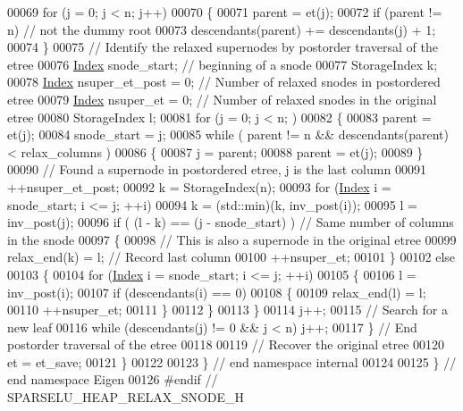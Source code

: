 \begin{DoxyCode}
00069   \textcolor{keywordflow}{for} (j = 0; j < n; j++) 
00070   \{
00071     parent = et(j);
00072     \textcolor{keywordflow}{if} (parent != n) \textcolor{comment}{// not the dummy root}
00073       descendants(parent) += descendants(j) + 1;
00074   \}
00075   \textcolor{comment}{// Identify the relaxed supernodes by postorder traversal of the etree}
00076   \hyperlink{namespace_eigen_a62e77e0933482dafde8fe197d9a2cfde}{Index} snode\_start; \textcolor{comment}{// beginning of a snode }
00077   StorageIndex k;
00078   \hyperlink{namespace_eigen_a62e77e0933482dafde8fe197d9a2cfde}{Index} nsuper\_et\_post = 0; \textcolor{comment}{// Number of relaxed snodes in postordered etree }
00079   \hyperlink{namespace_eigen_a62e77e0933482dafde8fe197d9a2cfde}{Index} nsuper\_et = 0; \textcolor{comment}{// Number of relaxed snodes in the original etree }
00080   StorageIndex l; 
00081   \textcolor{keywordflow}{for} (j = 0; j < n; )
00082   \{
00083     parent = et(j);
00084     snode\_start = j; 
00085     \textcolor{keywordflow}{while} ( parent != n && descendants(parent) < relax\_columns ) 
00086     \{
00087       j = parent; 
00088       parent = et(j);
00089     \}
00090     \textcolor{comment}{// Found a supernode in postordered etree, j is the last column }
00091     ++nsuper\_et\_post;
00092     k = StorageIndex(n);
00093     \textcolor{keywordflow}{for} (\hyperlink{namespace_eigen_a62e77e0933482dafde8fe197d9a2cfde}{Index} i = snode\_start; i <= j; ++i)
00094       k = (std::min)(k, inv\_post(i));
00095     l = inv\_post(j);
00096     \textcolor{keywordflow}{if} ( (l - k) == (j - snode\_start) )  \textcolor{comment}{// Same number of columns in the snode}
00097     \{
00098       \textcolor{comment}{// This is also a supernode in the original etree}
00099       relax\_end(k) = l; \textcolor{comment}{// Record last column }
00100       ++nsuper\_et; 
00101     \}
00102     \textcolor{keywordflow}{else} 
00103     \{
00104       \textcolor{keywordflow}{for} (\hyperlink{namespace_eigen_a62e77e0933482dafde8fe197d9a2cfde}{Index} i = snode\_start; i <= j; ++i) 
00105       \{
00106         l = inv\_post(i);
00107         \textcolor{keywordflow}{if} (descendants(i) == 0) 
00108         \{
00109           relax\_end(l) = l;
00110           ++nsuper\_et;
00111         \}
00112       \}
00113     \}
00114     j++;
00115     \textcolor{comment}{// Search for a new leaf}
00116     \textcolor{keywordflow}{while} (descendants(j) != 0 && j < n) j++;
00117   \} \textcolor{comment}{// End postorder traversal of the etree}
00118   
00119   \textcolor{comment}{// Recover the original etree}
00120   et = et\_save; 
00121 \}
00122 
00123 \} \textcolor{comment}{// end namespace internal}
00124 
00125 \} \textcolor{comment}{// end namespace Eigen}
00126 \textcolor{preprocessor}{#endif // SPARSELU\_HEAP\_RELAX\_SNODE\_H}
\end{DoxyCode}
